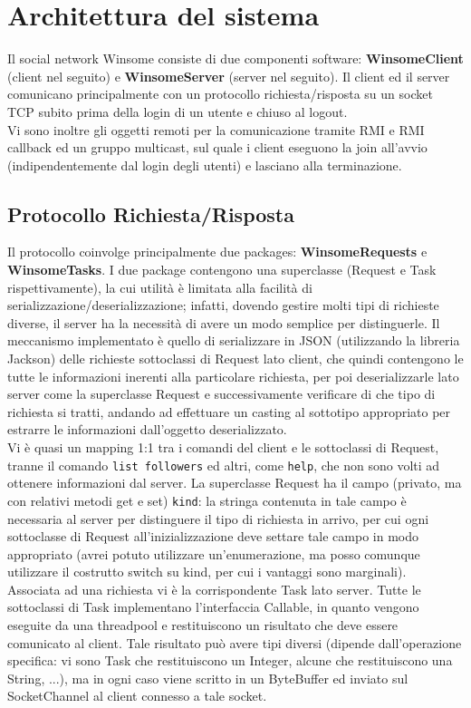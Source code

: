 \section{Architettura del sistema}
Il social network Winsome consiste di due componenti software: \textbf{WinsomeClient} (client nel seguito)
 e \textbf{WinsomeServer} (server nel seguito). Il client ed il server comunicano principalmente con un 
 protocollo richiesta/risposta su un socket TCP subito prima della login di un utente e chiuso al logout.\\
 Vi sono inoltre gli oggetti remoti per la comunicazione tramite RMI e RMI callback ed un gruppo multicast,
 sul quale i client eseguono la join all'avvio (indipendentemente dal login degli utenti) e lasciano alla terminazione.\\
 
 \subsection{Protocollo Richiesta/Risposta}
 Il protocollo coinvolge principalmente due packages: \textbf{WinsomeRequests} e \textbf{WinsomeTasks}.
 I due package contengono una superclasse (Request e Task rispettivamente), la cui utilità è limitata alla
 facilità di serializzazione/deserializzazione; infatti, dovendo gestire molti tipi di richieste diverse, il server
 ha la necessità di avere un modo semplice per distinguerle. Il meccanismo implementato è quello di serializzare in
 JSON (utilizzando la libreria Jackson) delle richieste sottoclassi di Request lato client, che quindi contengono
 le tutte le informazioni inerenti alla particolare richiesta, per poi deserializzarle lato server come la superclasse
 Request e successivamente verificare di che tipo di richiesta si tratti, andando ad effettuare un casting al sottotipo
 appropriato per estrarre le informazioni dall'oggetto deserializzato.\\
 Vi è quasi un mapping 1:1 tra i comandi del client e le sottoclassi di Request, tranne il comando \verb|list followers|
  ed altri, come \verb|help|, che non sono volti ad ottenere informazioni dal server. 
  La superclasse Request ha il campo (privato, ma con relativi metodi get e set) \verb|kind|: 
 la stringa contenuta in tale campo è necessaria al server per distinguere il tipo di richiesta in arrivo, per cui
 ogni sottoclasse di Request all'inizializzazione deve settare tale campo in modo appropriato 
 (avrei potuto utilizzare un'enumerazione, ma posso comunque utilizzare il costrutto switch su kind, per cui i vantaggi sono marginali).\\
 Associata ad una richiesta vi è la corrispondente Task lato server. Tutte le sottoclassi di Task implementano l'interfaccia
 Callable, in quanto vengono eseguite da una threadpool e restituiscono un risultato che deve essere comunicato al client.
 Tale risultato può avere tipi diversi (dipende dall'operazione specifica: vi sono Task che restituiscono un Integer, 
 alcune che restituiscono una String, ...), ma in ogni caso viene scritto in un ByteBuffer ed inviato sul SocketChannel al 
 client connesso a tale socket.\\\\
 
